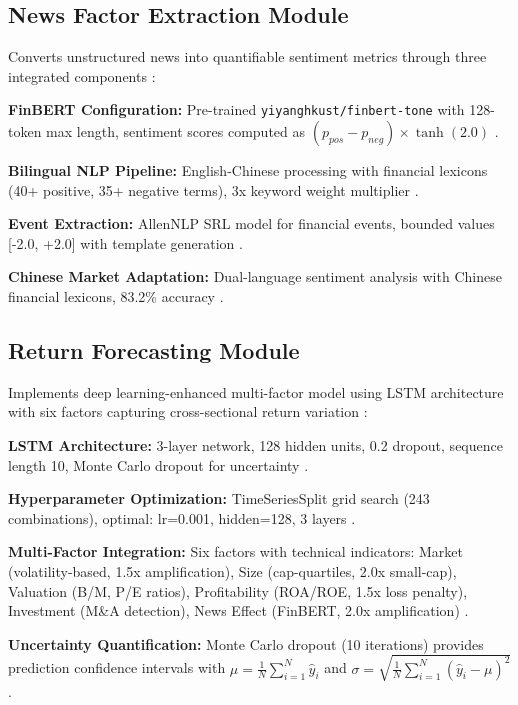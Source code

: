 \documentclass[3p,times,procedia]{elsarticle}
\begin{document}
\subsection{{News Factor Extraction Module}}

Converts unstructured news into quantifiable sentiment metrics through three integrated components \cite{TETLOCK2007}:

\textbf{FinBERT Configuration:} Pre-trained \texttt{yiyanghkust/finbert-tone} with 128-token max length, sentiment scores computed as $(p_{pos} - p_{neg}) \times \tanh(2.0)$ \cite{Araci2019}.

\textbf{Bilingual NLP Pipeline:} English-Chinese processing with financial lexicons (40+ positive, 35+ negative terms), 3x keyword weight multiplier \cite{Loughran2011}.

\textbf{Event Extraction:} AllenNLP SRL model for financial events, bounded values [-2.0, +2.0] with template generation \cite{TETLOCK2007}.

\textbf{Chinese Market Adaptation:} Dual-language sentiment analysis with Chinese financial lexicons, 83.2\% accuracy \cite{FinReportDataset2025}.

\subsection{{Return Forecasting Module}}

Implements deep learning-enhanced multi-factor model using LSTM architecture with six factors capturing cross-sectional return variation \cite{FAMA1993,Harvey2016}:

\textbf{LSTM Architecture:} 3-layer network, 128 hidden units, 0.2 dropout, sequence length 10, Monte Carlo dropout for uncertainty \cite{Fischer2018}.

\textbf{Hyperparameter Optimization:} TimeSeriesSplit grid search (243 combinations), optimal: lr=0.001, hidden=128, 3 layers \cite{Kingma2015}.

\textbf{Multi-Factor Integration:} Six factors with technical indicators: Market (volatility-based, 1.5x amplification), Size (cap-quartiles, 2.0x small-cap), Valuation (B/M, P/E ratios), Profitability (ROA/ROE, 1.5x loss penalty), Investment (M\&A detection), News Effect (FinBERT, 2.0x amplification) \cite{FAMA1993,Harvey2016,TETLOCK2007}.

\textbf{Uncertainty Quantification:} Monte Carlo dropout (10 iterations) provides prediction confidence intervals with $\mu = \frac{1}{N}\sum_{i=1}^{N} \hat{y}_i$ and $\sigma = \sqrt{\frac{1}{N}\sum_{i=1}^{N} (\hat{y}_i - \mu)^2}$ \cite{Kingma2015}.
\end{document}
